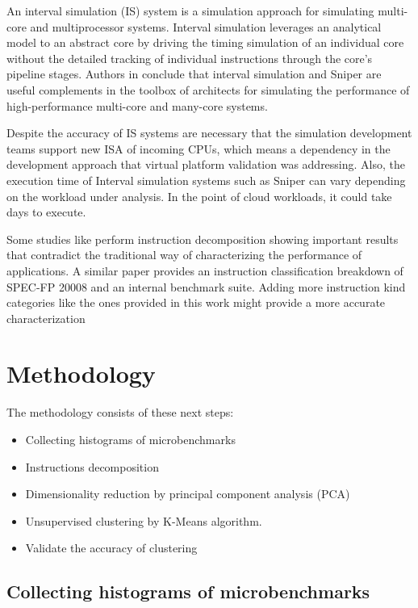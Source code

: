 \documentclass[]{PhDEngScITESO-R}
\begin{document}
An interval simulation (IS) system is a simulation approach for simulating multi-core and multiprocessor systems. Interval simulation leverages an analytical model to an abstract core by driving the timing simulation of an individual core without the detailed tracking of individual instructions through the core's pipeline stages. Authors in \cite{Carlson} conclude that interval simulation and Sniper are useful complements in the toolbox of architects for simulating the performance of high-performance multi-core and many-core systems.

Despite the accuracy of IS systems are necessary that the simulation development teams support new ISA of incoming CPUs, which means a dependency in the development approach that virtual platform validation was addressing. Also, the execution time of Interval simulation systems such as Sniper can vary depending on the workload under analysis. In the point of cloud workloads, it could take days to execute. 

Some studies like \cite{Cheveresan} perform instruction decomposition showing important results that contradict the traditional way of characterizing the performance of applications. A similar paper \cite{Rupnow} provides an instruction classification breakdown of SPEC-FP 20008 and an internal benchmark suite. Adding more instruction kind categories like the ones provided in this work might provide a more accurate characterization

\section{Methodology}
\label{sec:Methodology}

The methodology consists of these next steps:

\begin{itemize}
 \item Collecting histograms of microbenchmarks
 \item Instructions decomposition
 \item Dimensionality reduction by principal component analysis (PCA)
 \item Unsupervised clustering by K-Means algorithm.
 \item Validate the accuracy of clustering
\end{itemize}

\subsection{Collecting histograms of microbenchmarks}
\label{subsec: Instructions decomposition }
\end{document}
